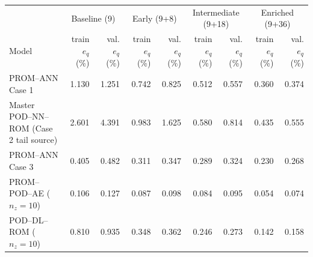 \begin{tabular}{lrr|rr|rr|rr}
\toprule
& \multicolumn{2}{c|}{Baseline (9)} & \multicolumn{2}{c|}{Early (9+8)} & \multicolumn{2}{c|}{Intermediate (9+18)} & \multicolumn{2}{c}{Enriched (9+36)} \\
Model & train $e_q$ (\%) & val. $e_q$ (\%) & train $e_q$ (\%) & val. $e_q$ (\%) & train $e_q$ (\%) & val. $e_q$ (\%) & train $e_q$ (\%) & val. $e_q$ (\%) \\
\midrule
PROM--ANN Case 1 & 1.130 & 1.251 & 0.742 & 0.825 & 0.512 & 0.557 & 0.360 & 0.374 \\
Master POD--NN--ROM (Case 2 tail source) & 2.601 & 4.391 & 0.983 & 1.625 & 0.580 & 0.814 & 0.435 & 0.555 \\
PROM--ANN Case 3 & 0.405 & 0.482 & 0.311 & 0.347 & 0.289 & 0.324 & 0.230 & 0.268 \\
PROM--POD--AE ($n_z=10$) & 0.106 & 0.127 & 0.087 & 0.098 & 0.084 & 0.095 & 0.054 & 0.074 \\
POD--DL--ROM ($n_z=10$) & 0.810 & 0.935 & 0.348 & 0.362 & 0.246 & 0.273 & 0.142 & 0.158 \\
\bottomrule
\end{tabular}
